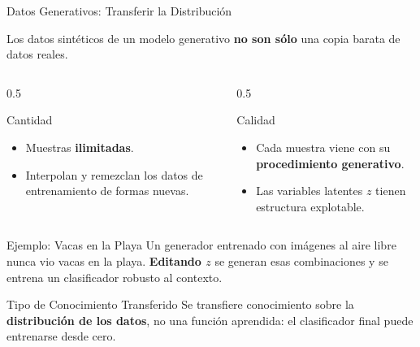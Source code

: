 \documentclass[aspectratio=169, 10pt]{beamer}
\begin{document}
\begin{frame}[shrink]{Datos Generativos: Transferir la Distribuci\'on}

	Los datos sint\'eticos de un modelo generativo \textbf{no son s\'olo} una copia barata de datos reales.

	\vspace{0.3cm}

	\begin{columns}[T]
		\begin{column}{0.5\textwidth}
			\begin{block}{Cantidad}
				\small
				\begin{itemize}
					\item Muestras \textbf{ilimitadas}.
					\item Interpolan y remezclan los datos de entrenamiento de formas nuevas.
				\end{itemize}
			\end{block}
		\end{column}

		\begin{column}{0.5\textwidth}
			\begin{block}{Calidad}
				\small
				\begin{itemize}
					\item Cada muestra viene con su \textbf{procedimiento generativo}.
					\item Las variables latentes $z$ tienen estructura explotable.
				\end{itemize}
			\end{block}
		\end{column}
	\end{columns}

	\vspace{0.3cm}

	\begin{block}{Ejemplo: Vacas en la Playa}
		Un generador entrenado con im\'agenes al aire libre nunca vio vacas en la playa. \textbf{Editando $z$} se generan esas combinaciones y se entrena un clasificador robusto al contexto.
	\end{block}

	\vspace{0.2cm}

	\begin{alertblock}{Tipo de Conocimiento Transferido}
		Se transfiere conocimiento sobre la \textbf{distribuci\'on de los datos}, no una funci\'on aprendida: el clasificador final puede entrenarse desde cero.
	\end{alertblock}

\end{frame}
\end{document}
